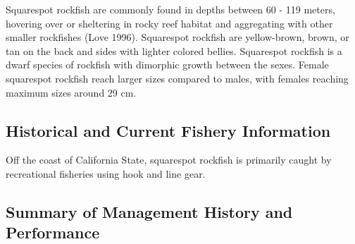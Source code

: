 \documentclass[11pt,
  english,
  a4paper,
]{article}
\begin{document}
\leavevmode\tagmcend\tagstructend


Squarespot rockfish are commonly found in depths between 60 - 119 meters, hovering over or sheltering in rocky reef habitat and aggregating with other smaller rockfishes {(Love 1996)\leavevmode\tagmcend\tagstructend}. Squarespot rockfish are yellow-brown, brown, or tan on the back and sides with lighter colored bellies. Squarespot rockfish is a dwarf species of rockfish with dimorphic growth between the sexes. Female squarespot rockfish reach larger sizes compared to males, with females reaching maximum sizes around 29 cm.

\leavevmode\tagmcend\tagstructend\par


\hypertarget{historical-and-current-fishery-information}{%
\subsection{Historical and Current Fishery Information}\label{historical-and-current-fishery-information}}

\leavevmode\tagmcend\tagstructend


Off the coast of California State, squarespot rockfish is primarily caught by recreational fisheries using hook and line gear.

\leavevmode\tagmcend\tagstructend\par


\hypertarget{summary-of-management-history-and-performance}{%
\subsection{Summary of Management History and Performance}\label{summary-of-management-history-and-performance}}

\leavevmode\tagmcend\tagstructend

\end{document}

